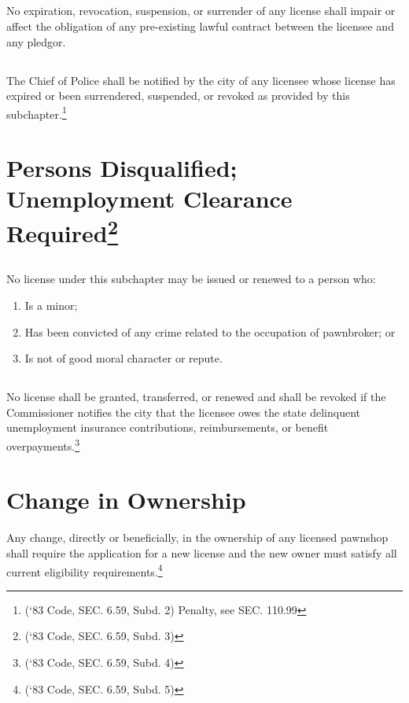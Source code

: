 \subsection{}
No expiration, revocation, suspension, or surrender of any license shall impair or affect the obligation of any pre-existing lawful contract between the licensee and any pledgor.
\subsection{}
The Chief of Police shall be notified by the city of any licensee whose license has expired or been surrendered, suspended, or revoked as provided by this subchapter.\footnote{(‘83 Code, SEC. 6.59, Subd. 2)  Penalty, see SEC. 110.99}

\section{Persons Disqualified; Unemployment Clearance Required\footnote{(‘83 Code, SEC. 6.59, Subd. 3)}}
\subsection{}
No license under this subchapter may be issued or renewed to a person who:
\begin{enumerate}[{\indent}1)]
    \item Is a minor; 
    \item Has been convicted of any crime related to the occupation of pawnbroker; or 
    \item Is not of good moral character or repute.
\end{enumerate}
\subsection{}
No license shall be granted, transferred, or renewed and shall be revoked if the Commissioner notifies the city that the licensee owes the state delinquent unemployment insurance contributions, reimbursements, or benefit overpayments.\footnote{(‘83 Code, SEC. 6.59, Subd. 4)}

\section{Change in Ownership}
Any change, directly or beneficially, in the ownership of any licensed pawnshop shall require the application for a new license and the new owner must satisfy all current eligibility requirements.\footnote{(‘83 Code, SEC. 6.59, Subd. 5)}

